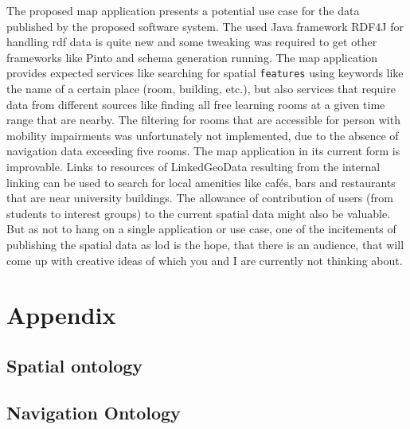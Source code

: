 \documentclass[draft,final]{vutinfth} %
\begin{document}
The proposed map application presents a potential use case for the data published by the proposed software system. The used Java framework RDF4J for handling \gls{rdf} data is quite new and some tweaking was required to get other frameworks like Pinto and schema generation running. The map application provides expected services like searching for spatial \texttt{features} using keywords like the name of a certain place (room, building, etc.), but also services that require data from different sources like finding all free learning rooms at a given time range that are nearby. The filtering for rooms that are accessible for person with mobility impairments was unfortunately not implemented, due to the absence of navigation data exceeding five rooms. The map application in its current form is improvable. Links to resources of LinkedGeoData resulting from the internal linking can be used to search for local amenities like cafés, bars and restaurants that are near university buildings. The allowance of contribution of users (from students to interest groups) to the current spatial data might also be valuable. But as not to hang on a single application or use case, one of the incitements of publishing the spatial data as \gls{lod} is the hope, that there is an audience, that will come up with creative ideas of which you and I are currently not thinking about.

\chapter{Appendix}
\label{appendix}

\section{Spatial ontology}
\label{appendix-spatial-ontology}



\section{Navigation Ontology}
\label{appendix-navigation-ontology}




\backmatter

\listoffigures %

\listoftables %

\printindex

\printglossaries



\end{document}
